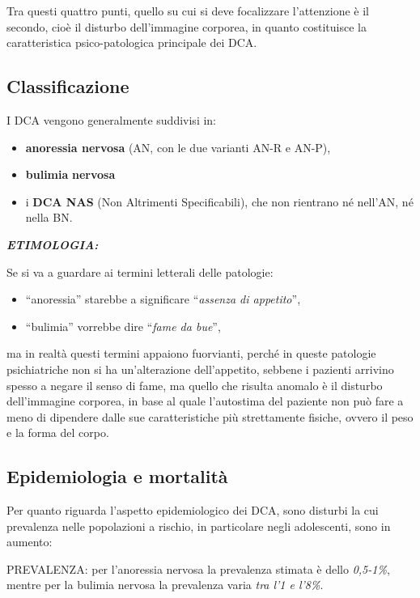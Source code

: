 Tra questi quattro punti, quello su cui si deve focalizzare l'attenzione
è il secondo, cioè il disturbo dell'immagine corporea, in quanto
costituisce la caratteristica psico-patologica principale dei DCA.

\subsection{Classificazione}

I DCA vengono generalmente suddivisi in:

\begin{itemize}
\item
  \textbf{anoressia nervosa} (AN, con le due varianti AN-R e AN-P),
\item
  \textbf{bulimia} \textbf{nervosa}
\item
  i \textbf{DCA NAS} (Non Altrimenti Specificabili), che non rientrano
  né nell'AN, né nella BN.
\end{itemize}

\textbf{\emph{ETIMOLOGIA:}}

Se si va a guardare ai termini letterali delle patologie:

\begin{itemize}
\item
  ``anoressia'' starebbe a significare ``\emph{assenza di appetito}'',
\item
  ``bulimia'' vorrebbe dire ``\emph{fame da bue}'',
\end{itemize}

ma in realtà questi termini appaiono fuorvianti, perché in queste
patologie psichiatriche non si ha un'alterazione dell'appetito, sebbene
i pazienti arrivino spesso a negare il senso di fame, ma quello che
risulta anomalo è il disturbo dell'immagine corporea, in base al quale
l'autostima del paziente non può fare a meno di dipendere dalle sue
caratteristiche più strettamente fisiche, ovvero il peso e la forma del
corpo.

\subsection{Epidemiologia e mortalità}

Per quanto riguarda l'aspetto epidemiologico dei DCA, sono disturbi la
cui prevalenza nelle popolazioni a rischio, in particolare negli
adolescenti, sono in aumento:

PREVALENZA: per l'anoressia nervosa la prevalenza stimata è dello
\emph{0,5-1\%}, mentre per la bulimia nervosa la prevalenza varia
\emph{tra l'1 e l'8\%}.

